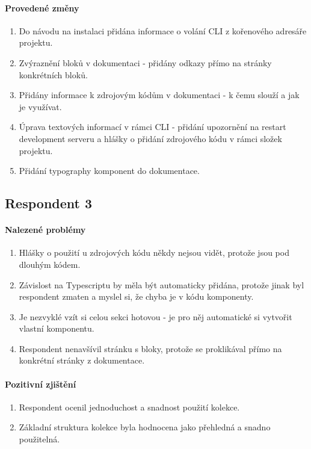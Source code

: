 \paragraph{Provedené změny}
\begin{enumerate}
  \item Do návodu na instalaci přidána informace o volání CLI z kořenového adresáře projektu.
  \item Zvýraznění bloků v dokumentaci - přidány odkazy přímo na stránky konkrétních bloků.
  \item Přidány informace k zdrojovým kódům v dokumentaci - k čemu slouží a jak je využívat.
  \item Úprava textových informací v rámci CLI - přidání upozornění na restart development serveru a hlášky o přidání zdrojového kódu v rámci složek projektu.
  \item Přidání typography komponent do dokumentace.
\end{enumerate}


\subsection{Respondent 3}

\paragraph{Nalezené problémy}
\begin{enumerate}
  \item Hlášky o použití u zdrojových kódu někdy nejsou vidět, protože jsou pod dlouhým kódem.
  \item Závislost na Typescriptu by měla být automaticky přidána, protože jinak byl respondent zmaten a myslel si, že chyba je v kódu komponenty.
  \item Je nezvyklé vzít si celou sekci hotovou - je pro něj automatické si vytvořit vlastní komponentu.
  \item Respondent nenavšívil stránku s bloky, protože se proklikával přímo na konkrétní stránky z dokumentace.
\end{enumerate}

\paragraph{Pozitivní zjištění}
\begin{enumerate}
  \item Respondent ocenil jednoduchost a snadnost použití kolekce.
  \item Základní struktura kolekce byla hodnocena jako přehledná a snadno použitelná.
\end{enumerate}

